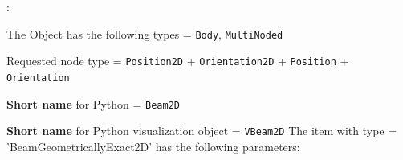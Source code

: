 \noindent {}:
\bi
  \item The Object has the following types = \texttt{Body}, \texttt{MultiNoded}
  \item Requested node type = \texttt{Position2D} + \texttt{Orientation2D} + \texttt{Position} + \texttt{Orientation}
  \item {\bf Short name} for Python = \texttt{Beam2D}
  \item {\bf Short name} for Python visualization object = \texttt{VBeam2D}
\ei\vspace{12pt} \noindent 
The item  with type = 'BeamGeometricallyExact2D' has the following parameters:
\vspace{-0.5cm}\\
\vspace{-0.5cm}\\
